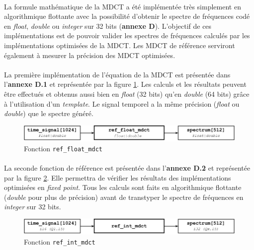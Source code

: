 \documentclass{article}
\begin{document}
    \paragraph{}
    La formule mathématique de la MDCT a été implémentée très simplement en algorithmique flottante avec la possibilité d'obtenir le spectre de fréquences codé en \emph{float}, \emph{double} ou \emph{integer} sur 32 bits (\textbf{annexe D}). L'objectif de ces implémentations est de pouvoir valider les spectres de fréquences calculés par les implémentations optimisées de la MDCT. Les MDCT de référence serviront également à mesurer la précision des MDCT optimisées.

    \paragraph{}
    La première implémentation de l'équation de la MDCT est présentée dans l'\textbf{annexe D.1} et représentée par la figure \ref{fig:func_ref_float_mdct}. Les calculs et les résultats peuvent être effectués et obtenus aussi bien en \emph{float} (32 bits) qu'en \emph{double} (64 bits) grâce à l'utilisation d'un \emph{template}. Le signal temporel a la même précision (\emph{float} ou \emph{double}) que le spectre généré.
    \begin{figure}[H]
        \centering
        \includegraphics[width=.8\linewidth]{./images/func_ref_float_mdct.pdf}
        \caption{Fonction \texttt{ref\_float\_mdct}}
        \label{fig:func_ref_float_mdct}
    \end{figure}

    \paragraph{}
    La seconde fonction de référence est présentée dans l'\textbf{annexe D.2} et représentée par la figure \ref{fig:func_ref_int_mdct}. Elle permettra de vérifier les résultats des implémentations optimisées en \emph{fixed point}. Tous les calculs sont faits en algorithmique flottante (\emph{double} pour plus de précision) avant de transtyper le spectre de fréquences en \emph{integer} sur 32 bits.
    \begin{figure}[H]
        \centering
        \includegraphics[width=.8\linewidth]{./images/func_ref_int_mdct.pdf}
        \caption{Fonction \texttt{ref\_int\_mdct}}
        \label{fig:func_ref_int_mdct}
    \end{figure}
    
\end{document}
